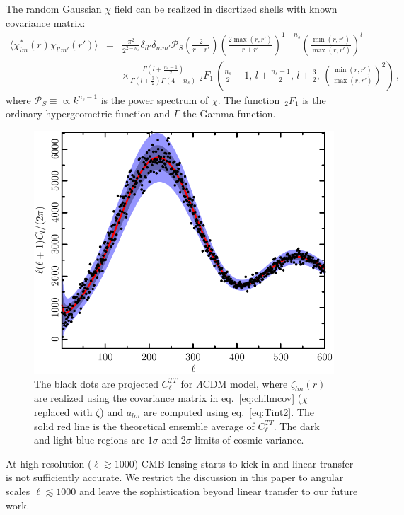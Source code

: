 The random Gaussian $\chi$ field can be realized in discrtized shells with known covariance matrix:
\begin{eqnarray}
  \langle \chi^*_{lm}(r) \chi_{l'm'}(r')\rangle &=& \frac{\pi^2}{2^{2-n_s}}  \delta_{ll'}\delta_{mm'} \mathcal{P}_S\left(\frac{2}{r+r'}\right) \left(\frac{2\max(r,r')}{r+r'}\right)^{1-n_s} \left(\frac{\min(r, r')}{\max(r,r')}\right)^l \label{eq:chilmcov} \\
 &&  \times \frac{\Gamma\left(l+\frac{n_s-1}{2}\right)}{\Gamma\left(l+\frac{3}{2}\right)\Gamma\left(4-n_s\right)} {\ _2F_1\,}\left( \frac{n_s}{2}-1,\, l+\frac{n_s-1}{2},\, l+ \frac{3}{2},\, \left(\frac{\min(r, r')}{\max(r,r')}\right)^2\right)     \nonumber \, , 
\end{eqnarray}
where $\mathcal{P}_S\equiv \propto k^{n_s-1} $ is the power spectrum of $\chi$. The function $\,_2F_1$ is the ordinary hypergeometric function and $\Gamma$ the Gamma function.


\begin{figure}
  \includegraphics[width=\textwidth]{ClTT_proj.pdf}
  \caption{The black dots are projected $C_\ell^{TT}$ for $\Lambda$CDM model, where $\zeta_{lm}(r)$ are realized using the covariance matrix in eq.~\eqref{eq:chilmcov} ($\chi$ replaced with $\zeta$) and $a_{lm}$ are computed using eq.~\eqref{eq:Tint2}. The solid red line is the theoretical ensemble average of $C_\ell^{TT}$. The dark and light blue regions are $1\sigma$ and $2\sigma$ limits of cosmic variance.}
\end{figure} 


At high resolution ($\ell \gtrsim 1000$) CMB lensing starts to kick in and linear transfer is not sufficiently accurate. We restrict the discussion in this paper to angular scales $\ell \lesssim 1000$ and leave the sophistication beyond linear transfer to our future work.


